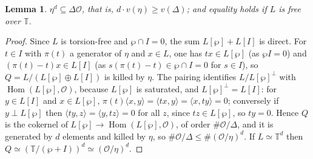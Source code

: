 \documentclass[11pt]{amsart}
\newtheorem{lemma}[theorem]{Lemma}
\theoremstyle{definition}
\newcommand{\T}{\mathbb{T}}
\begin{document}
\begin{lemma}\label{lem:ddt417}
$\eta^d\subseteq\Delta\mathcal{O}$, that is, $d\cdot v(\eta)\ge v(\Delta)$; and equality holds if $L$ is free over $\T$.
\end{lemma}
\begin{proof}
Since $L$ is torsion-free and $\wp\cap I=0$, the sum $L[\wp]+L[I]$ is direct. For $t\in I$ with $\pi(t)$ a generator of $\eta$ and $x\in L$, one has $tx\in L[\wp]$ (as $\wp I=0$) and $(\pi(t)-t)x\in L[I]$ (as $s(\pi(t)-t)\in\wp\cap I=0$ for $s\in I$), so $Q=L/(L[\wp]\oplus L[I])$ is killed by $\eta$. The pairing identifies $L/L[\wp]^\perp$ with $\operatorname{Hom}(L[\wp],\mathcal{O})$, because $L[\wp]$ is saturated, and $L[\wp]^\perp=L[I]$: for $y\in L[I]$ and $x\in L[\wp]$, $\pi(t)\langle x,y\rangle=\langle tx,y\rangle=\langle x,ty\rangle=0$; conversely if $y\perp L[\wp]$ then $\langle ty,z\rangle=\langle y,tz\rangle=0$ for all $z$, since $tz\in L[\wp]$, so $ty=0$. Hence $Q$ is the cokernel of $L[\wp]\to\operatorname{Hom}(L[\wp],\mathcal{O})$, of order $\#\mathcal{O}/\Delta$, and it is generated by $d$ elements and killed by $\eta$, so $\#\mathcal{O}/\Delta\le\#(\mathcal{O}/\eta)^d$. If $L\simeq\T^d$ then $Q\simeq(\T/(\wp+I))^d\simeq(\mathcal{O}/\eta)^d$.
\end{proof}
\end{document}
